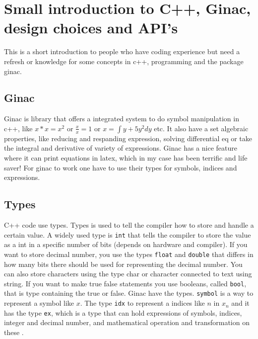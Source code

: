 \section{Small introduction to C++, Ginac, design choices and API's }
    This is a short introduction to people who have coding experience but need a refresh or knowledge for some concepts in c++, programming and the package ginac. 
    \subsection{Ginac}
    Ginac is library that offers a integrated system to do symbol manipulation in c++, like $x*x = x^2$ or $\frac{x}{x}=1$ or $x = \int y+5y^2 dy $ etc. It also have a set algebraic properties, like reducing and respanding expression, solving differential eq or take the integral and derivative of variety of expressions. Ginac has a nice feature where it can print equations in latex, which in my case has been terrific and life saver! For ginac to work one have to use their types for symbols, indices and expressions.
    \subsection{Types}
    C++ code use types. Types is used to tell the compiler how to store and handle a certain value. A widely used type is \texttt{int} that tells the compiler to store the value as a int in a specific number of bits (depends on hardware and compiler). If you want to store decimal number, you use the types \texttt{float} and \texttt{double} that differs in how many bits there should be used for representing the decimal number. You can also store characters using the type char or character connected to text using string. If you want to make true false statements you use booleans, called \texttt{bool}, that is type containing the true or false. Ginac have the types. \texttt{symbol} is a way to represent a symbol like $x$. The type \texttt{idx} to represent a indices like $n$ in $x_n$ and it has the type \texttt{ex}, which is a type that can hold expressions of symbols, indices, integer and decimal number, and mathematical operation and transformation on these \cite{Ginac}.
